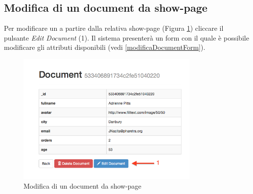 	\clearpage
	\subsection{Modifica di un document da show-page} %
	\label{modificadocumentdashowpage}

			Per modificare un  a partire dalla relativa show-page (Figura \ref{fig:modificadocumentdashowpage}) cliccare il pulsante \emph{Edit Document} (1). Il sistema presenterà un form con il quale è possibile modificare gli attributi disponibili (vedi \ref{modificaDocumentForm}).

				\begin{figure}[H]
					\centering \includegraphics[width=0.8\textwidth]{img/modificadocumentdashowpage.png}
				\caption{\label{fig:modificadocumentdashowpage} Modifica di un document da show-page}
				\end{figure}
	
	\clearpage
